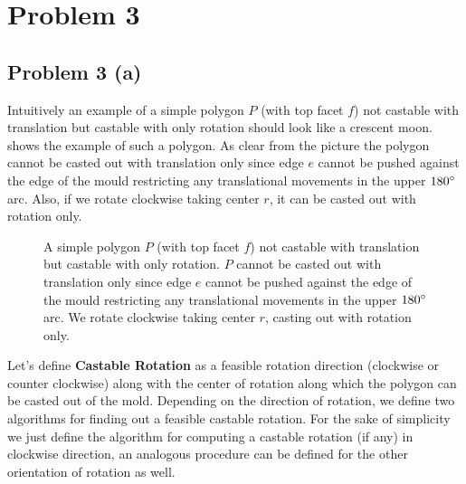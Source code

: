 \section{Problem 3}

\subsection{Problem 3 (a)}

	Intuitively an example of a simple polygon $P$ (with top facet $f$) not castable with translation but castable with only rotation should look like a crescent moon.  shows the example of such a polygon. As clear from the picture the polygon cannot be casted out with translation only since edge $e$ cannot be pushed against the edge of the mould restricting any translational movements in the upper $180\degree$ arc. Also, if we rotate clockwise taking center $r$, it can be casted out with rotation only. 
	
	
	\begin{figure}[!htbp]
		\hspace{-15pt}
			\centering
			\caption{A simple polygon $P$ (with top facet $f$) not castable with translation but castable with only rotation. $P$ cannot be casted out with translation only since edge $e$ cannot be pushed against the edge of the mould restricting any translational movements in the upper $180\degree$ arc. We rotate clockwise taking center $r$, casting out with rotation only. }
			\label{fig:moon}
	\end{figure}
	
	Let's define \textbf{Castable Rotation} as a feasible rotation direction (clockwise or counter clockwise) along with the center of rotation along which the polygon can be casted out of the mold. Depending on the direction of rotation, we define two algorithms for finding out a feasible castable rotation. For the sake of simplicity we just define the algorithm for computing a castable rotation (if any) in clockwise direction, an analogous procedure can be defined for the other orientation of rotation as well.
	
